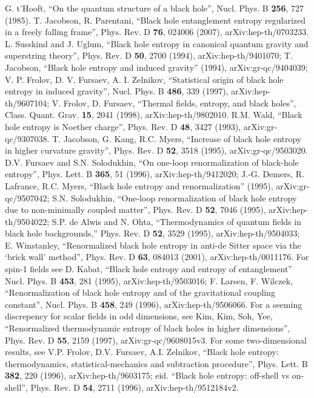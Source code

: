 \documentclass{article}
\begin{document}
\begin{thebibliography}{99}
G. t'Hooft, ``On the quantum structure of a black hole'', Nucl. Phys. B \textbf{256}, 727 (1985).
T. Jacobson, R. Parentani, ``Black hole entanglement entropy regularized in a freely falling frame'', Phys. Rev. D \textbf{76}, 024006 (2007), arXiv:hep-th/0703233.
L. Susskind and J. Uglum, ``Black hole entropy in canonical quantum gravity and superstring theory'', Phys. Rev. D \textbf{50}, 2700 (1994), arXiv:hep-th/9401070; T. Jacobson, ``Black hole entropy and induced gravity'' (1994), arXiv:gr-qc/9404039; V. P. Frolov, D. V. Fursaev, A. I. Zelnikov, ``Statistical origin of black hole entropy in induced gravity'', Nucl. Phys. B \textbf{486}, 339 (1997), arXiv:hep-th/9607104; V. Frolov, D. Fursaev, ``Thermal fields, entropy, and black holes'', Class. Quant. Grav. \textbf{15}, 2041 (1998), arXiv:hep-th/9802010.
R.M. Wald, ``Black hole entropy is Noether charge'', Phys. Rev. D \textbf{48}, 3427 (1993), arXiv:gr-qc/9307038.
T. Jacobson, G. Kang, R.C. Myers, ``Increase of black hole entropy in higher curvature gravity'', Phys. Rev. D \textbf{52}, 3518 (1995), arXiv:gr-qc/9503020.
D.V. Fursaev and S.N. Solodukhin, ``On one-loop renormalization of black-hole entropy'', Phys. Lett. B \textbf{365}, 51 (1996), arXiv:hep-th/9412020; J.-G. Demers, R. Lafrance, R.C. Myers, ``Black hole entropy and renormalization'' (1995), arXiv:gr-qc/9507042; S.N. Solodukhin, ``One-loop renormalization of black hole entropy due to non-minimally coupled matter'', Phys. Rev. D \textbf{52}, 7046 (1995), arXiv:hep-th/9504022; S.P. de Alwis and N. Ohta, ``Thermodynamics of quantum fields in black hole backgrounds,'' Phys. Rev. D \textbf{52}, 3529 (1995), arXiv:hep-th/9504033; E. Winstanley, ``Renormalized black hole entropy in anti-de Sitter space via the `brick wall' method'', Phys. Rev. D \textbf{63}, 084013 (2001), arXiv:hep-th/0011176.  For spin-1 fields see D. Kabat, ``Black hole entropy and entropy of entanglement'' Nucl. Phys. B \textbf{453}, 281 (1995), arXiv:hep-th/9503016; F. Larsen, F. Wilczek, ``Renormalization of black hole entropy and of the gravitational coupling constant'', Nucl. Phys. B \textbf{458}, 249 (1996), arXiv:hep-th/9506066.  For a seeming discrepency for scalar fields in odd dimensions, see Kim, Kim, Soh, Yee, ``Renormalized thermodynamic entropy of black holes in higher dimensions'', Phys. Rev. D \textbf{55}, 2159 (1997), arXiv:gr-qc/9608015v3.  For some two-dimensional results, see V.P. Frolov, D.V. Fursaev, A.I. Zelnikov, ``Black hole entropy: thermodynamics, statistical-mechanics and subtraction procedure'', Phys. Lett. B \textbf{382}, 220 (1996), arXiv:hep-th/9603175; eid. ``Black hole entropy: off-shell vs on-shell'', Phys. Rev. D \textbf{54}, 2711 (1996), arXiv:hep-th/9512184v2.  

\end{thebibliography}
\end{document}
